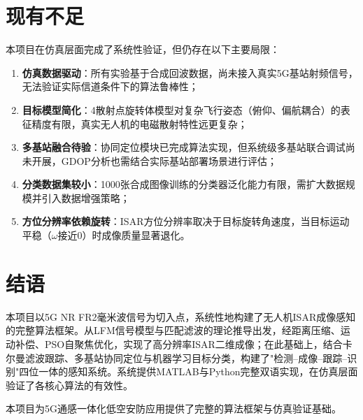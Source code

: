 \documentclass[12pt, a4paper]{article}
\begin{document}
\section{现有不足}

本项目在仿真层面完成了系统性验证，但仍存在以下主要局限：

\begin{enumerate}
  \item \textbf{仿真数据驱动}：所有实验基于合成回波数据，尚未接入真实5G基站射频信号，无法验证实际信道条件下的算法鲁棒性；
  \item \textbf{目标模型简化}：4散射点旋转体模型对复杂飞行姿态（俯仰、偏航耦合）的表征精度有限，真实无人机的电磁散射特性远更复杂；
  \item \textbf{多基站融合待验}：协同定位模块已完成算法实现，但系统级多基站联合调试尚未开展，GDOP分析也需结合实际基站部署场景进行评估；
  \item \textbf{分类数据集较小}：1000张合成图像训练的分类器泛化能力有限，需扩大数据规模并引入数据增强策略；
  \item \textbf{方位分辨率依赖旋转}：ISAR方位分辨率取决于目标旋转角速度，当目标运动平稳（$\omega$接近0）时成像质量显著退化。
\end{enumerate}

\section{结语}

本项目以5G NR FR2毫米波信号为切入点，系统性地构建了无人机ISAR成像感知的完整算法框架。从LFM信号模型与匹配滤波的理论推导出发，经距离压缩、运动补偿、PSO自聚焦优化，实现了高分辨率ISAR二维成像；在此基础上，结合卡尔曼滤波跟踪、多基站协同定位与机器学习目标分类，构建了"检测--成像--跟踪--识别"四位一体的感知系统。系统提供MATLAB与Python完整双语实现，在仿真层面验证了各核心算法的有效性。

本项目为5G通感一体化低空安防应用提供了完整的算法框架与仿真验证基础。
\end{document}
